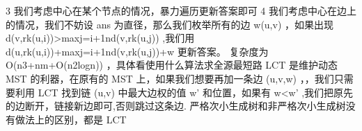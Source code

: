 {}\markdownRendererDollarSign{} 3 \markdownRendererDollarSign{}我们考虑中心在某个节点的情况，暴力遍历更新答案即可\markdownRendererParagraphSeparator
{}\markdownRendererDollarSign{} 4 \markdownRendererDollarSign{}我们考虑中心在边上的情况，我们不妨设\markdownRendererDollarSign{} ans \markdownRendererDollarSign{}为直径，那么我们枚举所有的边\markdownRendererDollarSign{} w(u,v) \markdownRendererDollarSign{}，如果出现\markdownRendererDollarSign{} d(v,rk(u,i))>max\markdownRendererUnderscore{}\markdownRendererLeftBrace{}j=i+1\markdownRendererRightBrace{}\markdownRendererCircumflex{}\markdownRendererLeftBrace{}n\markdownRendererRightBrace{}d(v,rk(u,j)) \markdownRendererDollarSign{},我们用\markdownRendererDollarSign{} d(u,rk(u,i))+max\markdownRendererUnderscore{}\markdownRendererLeftBrace{}j=i+1\markdownRendererRightBrace{}\markdownRendererCircumflex{}\markdownRendererLeftBrace{}n\markdownRendererRightBrace{}d(v,rk(u,j))+w \markdownRendererDollarSign{}更新答案。\markdownRendererParagraphSeparator
{}复杂度为\markdownRendererDollarSign{} O(n\markdownRendererCircumflex{}3+nm+O(n\markdownRendererCircumflex{}2logn)) \markdownRendererDollarSign{}，具体看使用什么算法求全源最短路\markdownRendererInterblockSeparator
{}\markdownRendererInterblockSeparator
{}
\markdownRendererSectionEnd \markdownRendererSectionBegin
{}\markdownRendererInterblockSeparator
{}\markdownRendererDollarSign{} LCT \markdownRendererDollarSign{}是维护动态\markdownRendererDollarSign{} MST \markdownRendererDollarSign{}的利器，在原有的\markdownRendererDollarSign{} MST\markdownRendererSoftLineBreak
{}\markdownRendererDollarSign{}上，如果我们想要再加一条边\markdownRendererDollarSign{} (u,v,w) \markdownRendererDollarSign{}，，我们只需要利用\markdownRendererDollarSign{} LCT \markdownRendererDollarSign{}找到链\markdownRendererDollarSign{} (u,v) \markdownRendererDollarSign{}中最大边权的值\markdownRendererDollarSign{} w\markdownRendererCircumflex{}\markdownRendererLeftBrace{}'\markdownRendererRightBrace{} \markdownRendererDollarSign{}和位置，如果有\markdownRendererDollarSign{} w<w\markdownRendererCircumflex{}\markdownRendererLeftBrace{}'\markdownRendererRightBrace{} \markdownRendererDollarSign{},我们把原先的边断开，链接新边即可,否则跳过这条边.\markdownRendererInterblockSeparator
{}\markdownRendererSectionBegin
{}\markdownRendererInterblockSeparator
{}严格次小生成树和非严格次小生成树没有做法上的区别，都是\markdownRendererDollarSign{} LCT\markdownRendererSoftLineBreak
